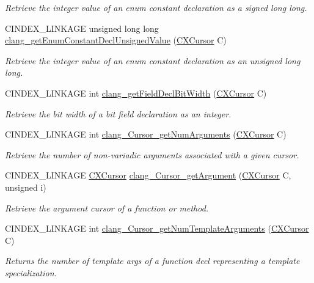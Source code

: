 \begin{DoxyCompactItemize}
\begin{DoxyCompactList}\small\item\em Retrieve the integer value of an enum constant declaration as a signed long long. \end{DoxyCompactList}\item 
C\+I\+N\+D\+E\+X\+\_\+\+L\+I\+N\+K\+A\+GE unsigned long long \hyperlink{group__CINDEX__TYPES_gaf7cbd4f2d371dd93e8bc997c951a1aef}{clang\+\_\+get\+Enum\+Constant\+Decl\+Unsigned\+Value} (\hyperlink{structCXCursor}{C\+X\+Cursor} C)
\begin{DoxyCompactList}\small\item\em Retrieve the integer value of an enum constant declaration as an unsigned long long. \end{DoxyCompactList}\item 
C\+I\+N\+D\+E\+X\+\_\+\+L\+I\+N\+K\+A\+GE int \hyperlink{group__CINDEX__TYPES_ga80bbb872dde5b2f26964081338108f91}{clang\+\_\+get\+Field\+Decl\+Bit\+Width} (\hyperlink{structCXCursor}{C\+X\+Cursor} C)
\begin{DoxyCompactList}\small\item\em Retrieve the bit width of a bit field declaration as an integer. \end{DoxyCompactList}\item 
C\+I\+N\+D\+E\+X\+\_\+\+L\+I\+N\+K\+A\+GE int \hyperlink{group__CINDEX__TYPES_ga5254f761b57fd78de3ac9c6bfcaa7fed}{clang\+\_\+\+Cursor\+\_\+get\+Num\+Arguments} (\hyperlink{structCXCursor}{C\+X\+Cursor} C)
\begin{DoxyCompactList}\small\item\em Retrieve the number of non-\/variadic arguments associated with a given cursor. \end{DoxyCompactList}\item 
C\+I\+N\+D\+E\+X\+\_\+\+L\+I\+N\+K\+A\+GE \hyperlink{structCXCursor}{C\+X\+Cursor} \hyperlink{group__CINDEX__TYPES_ga673c5529d33eedd0b78aca5ac6fc1d7c}{clang\+\_\+\+Cursor\+\_\+get\+Argument} (\hyperlink{structCXCursor}{C\+X\+Cursor} C, unsigned i)
\begin{DoxyCompactList}\small\item\em Retrieve the argument cursor of a function or method. \end{DoxyCompactList}\item 
C\+I\+N\+D\+E\+X\+\_\+\+L\+I\+N\+K\+A\+GE int \hyperlink{group__CINDEX__TYPES_gaa34e031c03fafb63accf8f9842a4b948}{clang\+\_\+\+Cursor\+\_\+get\+Num\+Template\+Arguments} (\hyperlink{structCXCursor}{C\+X\+Cursor} C)
\begin{DoxyCompactList}\small\item\em Returns the number of template args of a function decl representing a template specialization. \end{DoxyCompactList}\item 

\end{DoxyCompactItemize}
